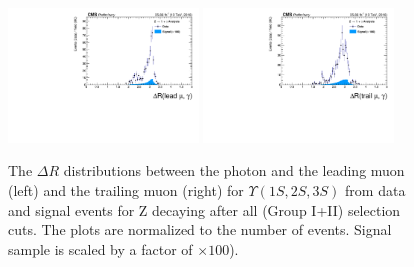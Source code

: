 \begin{figure}[!htbp]
\begin{center}
\includegraphics[width=0.45\textwidth]{figures_and_tables/outputPlots/ZtoUpsilon_Cat0_ZZZZZ/nEvts/data_x_mc/withKinCuts/h_withKin_deltaR_Leading_Photon}\hspace*{1.cm}
\includegraphics[width=0.45\textwidth]{figures_and_tables/outputPlots/ZtoUpsilon_Cat0_ZZZZZ/nEvts/data_x_mc/withKinCuts/h_withKin_deltaR_Trailing_Photon}\end{center}\vspace*{-.5cm}
\caption{The $\Delta R$ distributions between the photon and the leading muon (left) and the trailing muon (right) for $\Upsilon(1S,2S,3S)$ from data and signal events for Z decaying after all (Group I+II) selection cuts. The plots are normalized to the number of events. Signal sample is scaled by a factor of $\times 100$).}
\label{fig:deltaR_ZtoUpsilon_Cat0_groupI_plus_II}
\end{figure}


